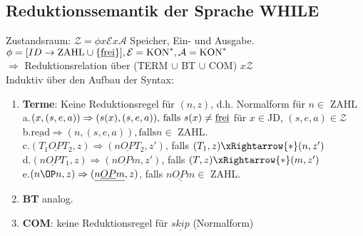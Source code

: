 \subsection{Reduktionssemantik der Sprache WHILE}
Zustandsraum: $\mathcal{Z} = \phi x \mathcal{E} x \mathcal{A}$ Speicher, Ein- und Ausgabe.
$\phi = [ID \rightarrow \text{ZAHL} \cup \{\text{\underline{frei}}\}], \mathcal{E}=\text{KON}^*, \mathcal{A}=\text{KON}^*$\\
$\Rightarrow$ Reduktionsrelation über (TERM $\cup$ BT $\cup$ COM) $x \mathcal{Z}$\\
Induktiv über den Aufbau der Syntax:
\begin{enumerate}
	\item \textbf{Terme}: Keine Reduktionsregel für $(n,z)$, d.h. Normalform für $n \in$ ZAHL\\
	a.$(x,(s,e,a)) \Rightarrow (s(x), (s,e,a))\text{, falls }s(x) \neq \text{\underline{frei}}$ für $x \in$JD, $(s,e,a) \in \mathcal{Z}$\\
	b.$\underline{\text{read}} \Rightarrow (n, (s,e,a)), \text{falls} n \in$ ZAHL.\\
	c.$(T_1 \underline{OP} T_2, z) \Rightarrow (n \underline{OP} T_2, z')$, falls $(T_1, z) \xRightarrow{*}(n,z')$\\
	d.$(n \underline{OP} T_1, z) \Rightarrow (n \underline{OP} m, z')$, falls $(T, z) \xRightarrow{*}(m,z')$\\
	e.$(n \OP n, z) \Rightarrow (\underline{n \underline{OP} m}, z)$, falls $\underline{n \underline{OP} m} \in$ ZAHL.\\
	\item \textbf{BT} analog.
	\item \textbf{COM}: keine Reduktionsregel für $\underline{skip}$ (Normalform)
\end{enumerate}
